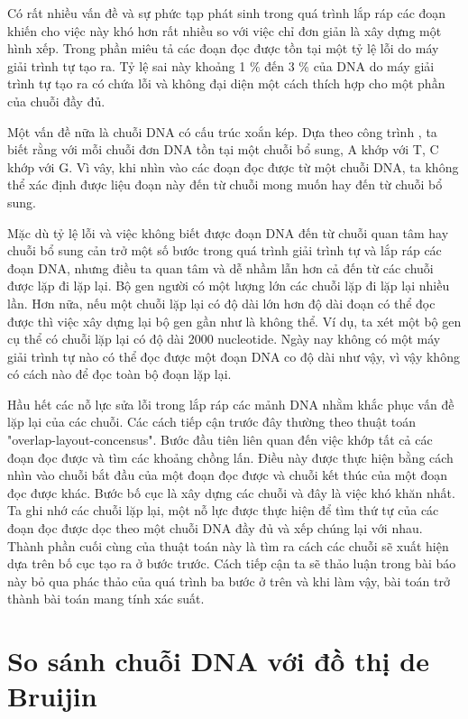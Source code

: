 \documentclass[14pt, a4paper]{article}
\numberwithin{equation}{section}
\numberwithin{figure}{section}
\numberwithin{dl}{section}
\numberwithin{md}{section}
\numberwithin{bd}{section}
\numberwithin{dn}{section}
\numberwithin{hq}{section}
\begin{document}
    Có rất nhiều vấn đề và sự phức tạp phát sinh trong quá trình lắp ráp các đoạn khiến cho việc này khó hơn rất nhiều so với việc chỉ đơn giản là xây dựng một hình xếp.
    Trong phần miêu tả các đoạn đọc được tồn tại một tỷ lệ lỗi do máy giải trình tự tạo ra.
    Tỷ lệ sai này khoảng 1 \% đến 3 \% của DNA do máy giải trình tự tạo ra có chứa lỗi và không đại diện một cách thích hợp cho một phần của chuỗi đầy đủ.

    Một vấn đề nữa là chuỗi DNA có cấu trúc xoắn kép.
    Dựa theo công trình \cite{watson2003molecular}, ta biết rằng với mỗi chuỗi đơn DNA tồn tại một chuỗi bổ sung, A khớp với T, C khớp với G.
    Vì vây, khi nhìn vào các đoạn đọc được từ một chuỗi DNA, ta không thể xác định được liệu đoạn này đến từ chuỗi mong muốn hay đến từ chuỗi bổ sung.

    Mặc dù tỷ lệ lỗi và việc không biết được đoạn DNA đến từ chuỗi quan tâm hay chuỗi bổ sung cản trở một số bước trong quá trình giải trình tự và lắp ráp các đoạn DNA, nhưng điều ta quan tâm và dễ nhầm lẫn hơn cả đến từ các chuỗi được lặp đi lặp lại.
    Bộ gen người có một lượng lớn các chuỗi lặp đi lặp lại nhiều lần.
    Hơn nữa, nếu một chuỗi lặp lại có độ dài lớn hơn độ dài đoạn có thể đọc được thì việc xây dựng lại bộ gen gần như là không thể.
    Ví dụ, ta xét một bộ gen cụ thể có chuỗi lặp lại có độ dài 2000 nucleotide.
    Ngày nay không có một máy giải trình tự nào có thể đọc được một đoạn DNA co độ dài như vậy, vì vậy không có cách nào để đọc toàn bộ đoạn lặp lại.

    Hầu hết các nỗ lực sửa lỗi trong lắp ráp các mảnh DNA nhằm khắc phục vấn đề lặp lại của các chuỗi.
    Các cách tiếp cận trước đây thường theo thuật toán "overlap-layout-concensus".
    Bước đầu tiên liên quan đến việc khớp tất cả các đoạn đọc được và tìm các khoảng chồng lấn.
    Điều này được thực hiện bằng cách nhìn vào chuỗi bắt đầu của một đoạn đọc được và chuỗi kết thúc của một đoạn đọc được khác.
    Bước bố cục là xây dựng các chuỗi và đây là việc khó khăn nhất.
    Ta ghi nhớ các chuỗi lặp lại, một nỗ lực được thực hiện để tìm thứ tự của các đoạn đọc được dọc theo một chuỗi DNA đầy đủ và xếp chúng lại với nhau.
    Thành phần cuối cùng của thuật toán này là tìm ra cách các chuỗi sẽ xuất hiện dựa trên bố cục tạo ra ở bước trước.
    Cách tiếp cận ta sẽ thảo luận trong bài báo này bỏ qua phác thảo của quá trình ba bước ở trên và khi làm vậy, bài toán trở thành bài toán mang tính xác suất.
    
    \section{So sánh chuỗi DNA với đồ thị de Bruijin}
\end{document}
